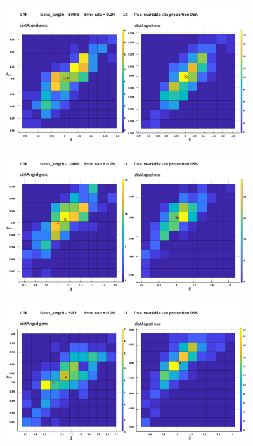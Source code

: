 \documentclass{article}
\begin{document}
\begin{figure}
\begin{subfigure}{.5\textwidth}
\end{subfigure}
\newline
\begin{subfigure}{.5\textwidth}
  \centering
  \includegraphics[width=.99\linewidth]{500k95.png}  
  \caption{}
  \label{fig:2D95s3}
\end{subfigure}
\begin{subfigure}{.5\textwidth}
  \centering
  \includegraphics[width=.99\linewidth]{100k95.png}  
  \caption{}
  \label{fig:2D95s4}
\end{subfigure}
\newline
\begin{subfigure}{.5\textwidth}
  \centering
  \includegraphics[width=.99\linewidth]{50k95.png}  

\end{subfigure}
\end{figure}
\end{document}
